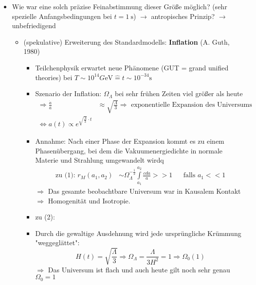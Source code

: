 \begin{itemize}
\begin{enumerate}[label={(\arabic*)}]
\begin{itemize}[label={$\to$}]
\begin{itemize}[label={$\Rightarrow$}]
						\end{itemize}
					\item Wie war eine solch präzise Feinabstimmung dieser Größe möglich? (sehr spezielle Anfangsbedingungen bei $t=\SI{1}{\s}$) $\to$ antropisches Prinzip? $\to$ unbefriedigend
						\begin{itemize}[label={$\Rightarrow$}]
							\item (spekulative) Erweiterung des Standardmodells: \textbf{Inflation} (A. Guth, 1980)
								\begin{itemize}[label={$\to$}]
									\item Teilchenphysik erwartet neue Phänomene (GUT = grand unified theories) bei $T\sim 10^{14} \si{G\eV}\hat{=}t\sim 10^{-34}\si{\s}$
									\item Szenario der Inflation: $\Omega_\Lambda$ bei sehr frühen Zeiten viel größer als heute
										\begin{align*}
											\Rightarrow \frac{\dot{a}}{a}&\approx\sqrt{\frac{\Lambda}{3}} \Rightarrow \text{ exponentielle Expansion des Universums}\\
											\Leftrightarrow a(t)\propto e^{\sqrt{\frac{\Lambda}{3}}\cdot t}
										\end{align*}
									\item Annahme: Nach einer Phase der Expansion kommt es zu einem Phasenübergang, bei dem die Vakuumenergiedichte in normale Materie und Strahlung umgewandelt wirdq
										\begin{align*}
											\text{zu (1): } r_M(a_1,a_2)&\sim \Omega_\Lambda^{-\frac{1}{2}}\int\limits_{a_1}^{a_2}\frac{cda}{a}>>1 & &\text{falls } a_1<<1
										\end{align*}
										$\Rightarrow$ Das gesamte beobachtbare Universum war in Kausalem Kontakt $\Rightarrow$ Homogenität und Isotropie.\\
									\item[] zu (2):
									\item Durch die gewaltige Ausdehnung wird jede ursprüngliche Krümmung "weggeglättet":
										\begin{equation*}
											H(t)=\sqrt{\frac{\Lambda}{3}}\Rightarrow\Omega_\Lambda=\frac{\Lambda}{3H^2}=1\Rightarrow \Omega_0(1)
										\end{equation*}
										$\Rightarrow$ Das Universum ist flach und auch heute gilt noch sehr genau $\Omega_0=1$
										\begin{figure}[H]
											\centering
											\begin{tikzpicture}

\end{tikzpicture}
\end{figure}
\end{itemize}
\end{itemize}
\end{itemize}
\end{enumerate}
\end{itemize}
